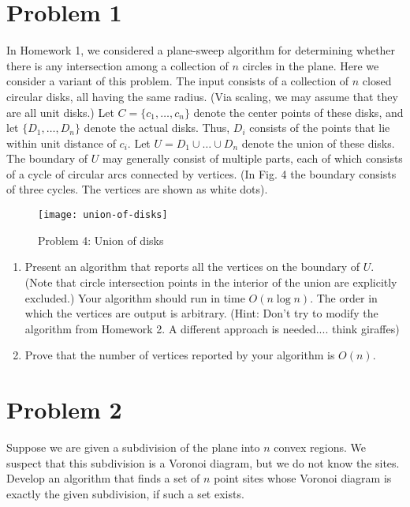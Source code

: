 \documentclass[11pt]{article}
\begin{document}

\newpage
\section*{Problem 1}

In Homework 1, we considered a plane-sweep algorithm for determining whether
there is any intersection among a collection of $n$ circles in the plane. Here
we consider a variant of this problem. The input consists of a collection of $n$
closed circular disks, all having the same radius. (Via scaling, we may assume
that they are all unit disks.) Let $C = \{c_1, \ldots , c_n\}$ denote the center
points of these disks, and let $\{D_1, \ldots, D_n\}$ denote the actual disks.
Thus, $D_i$ consists of the points that lie within unit distance of $c_i$. Let
$U = D_1 \cup \ldots \cup D_n$ denote the union of these disks. The boundary of
$U$ may generally consist of multiple parts, each of which consists of a cycle
of circular arcs connected by vertices. (In Fig. 4 the boundary consists of
three cycles. The vertices are shown as white dots).

\begin{figure}[h]
    \centering
    \texttt{[image: union-of-disks]}
    \caption{Problem 4: Union of disks}
\end{figure}


\begin{enumerate}

    \item Present an algorithm that reports all the vertices on the boundary of
        $U$. (Note that circle intersection points in the interior of the union
        are explicitly excluded.) Your algorithm should run in time $O(n \log
        n)$.  The order in which the vertices are output is arbitrary. (Hint:
        Don't try to modify the algorithm from Homework 2. A different approach
        is needed.... think giraffes)

    \item Prove that the number of vertices reported by your algorithm is
        $O(n)$.

\end{enumerate}

\newpage
\section*{Problem 2}

Suppose we are given a subdivision of the plane into $n$ convex regions. We
suspect that this subdivision is a Voronoi diagram, but we do not know the
sites. Develop an algorithm that finds a set of $n$ point sites whose Voronoi
diagram is exactly the given subdivision, if such a set exists.
\end{document}
